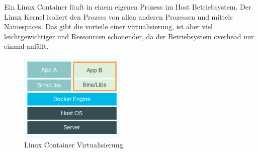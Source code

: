 Ein Linux Container läuft in einem eigenen Prozess im Host Betriebsystem. Der Linux Kernel isoliert
den Prozess von allen anderen Prozessen und mittels Namespaces. Das gibt die vorteile einer
virtualisierung, ist aber viel leichtgewichtiger und Ressourcen schonender, da der Betriebsystem
overhead nur einmal anfällt.

\begin{figure}[htbp]
  \begin{center}
    \includegraphics[width=0.45\textwidth]{./images/docker_container.png}
    \caption{Linux Container Virtualisierung}
    \label{img:docker_container}
  \end{center}
\end{figure}




